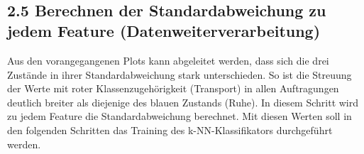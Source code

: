 \documentclass[11pt]{article}
\begin{document}
    \begin{center}
    \end{center}
    { \hspace*{\fill} \\}
    
    \begin{center}
    \end{center}
    { \hspace*{\fill} \\}
    
    \begin{center}
    \end{center}
    { \hspace*{\fill} \\}
    
    \begin{center}
    \end{center}
    { \hspace*{\fill} \\}
    
    \hypertarget{berechnen-der-standardabweichung-zu-jedem-feature-datenweiterverarbeitung}{%
\subsection*{2.5 Berechnen der Standardabweichung zu jedem Feature
(Datenweiterverarbeitung)}\label{berechnen-der-standardabweichung-zu-jedem-feature-datenweiterverarbeitung}}

    Aus den vorangegangenen Plots kann abgeleitet werden, dass sich die drei
Zustände in ihrer Standardabweichung stark unterschieden. So ist die
Streuung der Werte mit roter Klassenzugehörigkeit (Transport) in allen
Auftragungen deutlich breiter als diejenige des blauen Zustands (Ruhe).
In diesem Schritt wird zu jedem Feature die Standardabweichung
berechnet. Mit diesen Werten soll in den folgenden Schritten das
Training des k-NN-Klassifikators durchgeführt werden.
\end{document}
